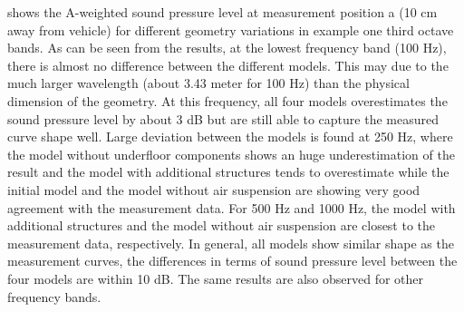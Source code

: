 \noindent{} shows the A-weighted sound pressure level at measurement position a (10 cm away from vehicle) for different geometry variations in example one third octave bands. As can be seen from the results, at the lowest frequency band (100 Hz), there is almost no difference between the different models. This may due to the much larger wavelength (about 3.43 meter for 100 Hz) than the physical dimension of the geometry. At this frequency, all four models overestimates the sound pressure level by about 3 dB but are still able to capture the measured curve shape well. Large deviation between the models is found at 250 Hz, where the model without underfloor components shows an huge underestimation of the result and the model with additional structures tends to overestimate while the initial model and the model without air suspension are showing very good agreement with the measurement data. For 500 Hz and 1000 Hz, the model with additional structures and the model without air suspension are closest to the measurement data, respectively. In general, all models show similar shape as the measurement curves, the differences in terms of sound pressure level between the four models are within 10 dB. The same results are also observed for other frequency bands.

